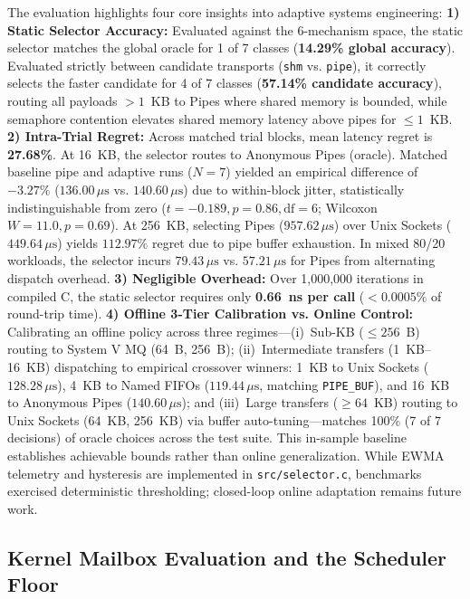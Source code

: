 The evaluation highlights four core insights into adaptive systems engineering:
\textbf{1) Static Selector Accuracy:} Evaluated against the 6-mechanism space, the static selector matches the global oracle for 1 of 7 classes (\textbf{14.29\% global accuracy}). Evaluated strictly between candidate transports (\texttt{shm} vs. \texttt{pipe}), it correctly selects the faster candidate for 4 of 7 classes (\textbf{57.14\% candidate accuracy}), routing all payloads $>1$~KB to Pipes where shared memory is bounded, while semaphore contention elevates shared memory latency above pipes for $\le 1$~KB.
\textbf{2) Intra-Trial Regret:} Across matched trial blocks, mean latency regret is \textbf{27.68\%}. At 16~KB, the selector routes to Anonymous Pipes (oracle). Matched baseline pipe and adaptive runs ($N=7$) yielded an empirical difference of $-3.27\%$ ($136.00\,\mu\text{s}$ vs. $140.60\,\mu\text{s}$) due to within-block jitter, statistically indistinguishable from zero ($t = -0.189, p = 0.86, \text{df} = 6$; Wilcoxon $W = 11.0, p = 0.69$). At 256~KB, selecting Pipes ($957.62\,\mu\text{s}$) over Unix Sockets ($449.64\,\mu\text{s}$) yields $112.97\%$ regret due to pipe buffer exhaustion. In mixed 80/20 workloads, the selector incurs $79.43\,\mu\text{s}$ vs. $57.21\,\mu\text{s}$ for Pipes from alternating dispatch overhead.
\textbf{3) Negligible Overhead:} Over 1,000,000 iterations in compiled C, the static selector requires only \textbf{0.66~ns per call} ($< 0.0005\%$ of round-trip time).
\textbf{4) Offline 3-Tier Calibration vs. Online Control:} Calibrating an offline policy across three regimes—(i)~Sub-KB ($\le 256$~B) routing to System V MQ (64~B, 256~B); (ii)~Intermediate transfers (1~KB--16~KB) dispatching to empirical crossover winners: 1~KB to Unix Sockets ($128.28\,\mu\text{s}$), 4~KB to Named FIFOs ($119.44\,\mu\text{s}$, matching \texttt{PIPE\_BUF}), and 16~KB to Anonymous Pipes ($140.60\,\mu\text{s}$); and (iii)~Large transfers ($\ge 64$~KB) routing to Unix Sockets (64~KB, 256~KB) via buffer auto-tuning—matches 100\% (7 of 7 decisions) of oracle choices across the test suite. This in-sample baseline establishes achievable bounds rather than online generalization. While EWMA telemetry and hysteresis are implemented in \texttt{src/selector.c}, benchmarks exercised deterministic thresholding; closed-loop online adaptation remains future work.

\subsection{Kernel Mailbox Evaluation and the Scheduler Floor}

